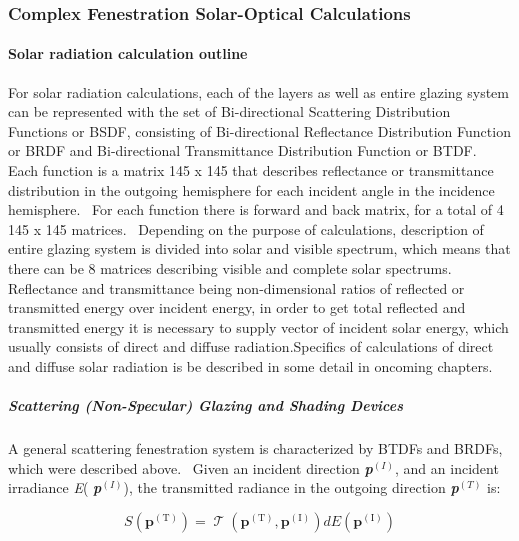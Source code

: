\subsubsection{Complex Fenestration Solar-Optical Calculations}\label{complex-fenestration-solar-optical-calculations}

\paragraph{\textbf{Solar radiation calculation outline}}\label{solar-radiation-calculation-outline}

For solar radiation calculations, each of the layers as well as entire glazing system can be represented with the set of Bi-directional Scattering Distribution Functions or BSDF, consisting of Bi-directional Reflectance Distribution Function or BRDF and Bi-directional Transmittance Distribution Function or BTDF.~ Each function is a matrix 145 x 145 that describes reflectance or transmittance distribution in the outgoing hemisphere for each incident angle in the incidence hemisphere.~ For each function there is forward and back matrix, for a total of 4 145 x 145 matrices.~ Depending on the purpose of calculations, description of entire glazing system is divided into solar and visible spectrum, which means that there can be 8 matrices describing visible and complete solar spectrums.~ Reflectance and transmittance being non-dimensional ratios of reflected or transmitted energy over incident energy, in order to get total reflected and transmitted energy it is necessary to supply vector of incident solar energy, which usually consists of direct and diffuse radiation.Specifics of calculations of direct and diffuse solar radiation is be described in some detail in oncoming chapters.

\subparagraph{\textbf{Scattering (Non-Specular) Glazing and Shading Devices}}\label{scattering-non-specular-glazing-and-shading-devices}

A general scattering fenestration system is characterized by BTDFs and BRDFs, which were described above.~ Given an incident direction \textbf{\emph{p}}\(^{(I)}\), and an incident irradiance \emph{E}( \textbf{\emph{p}}\(^{(I)}\)), the transmitted radiance in the outgoing direction \textbf{\emph{p}}\(^{(T)}\) is:

\begin{equation}
S({{\mathbf{p}}^{{\mathrm{(T)}}}}) = \operatorname{\mathcal{T}} ({{\mathbf{p}}^{{\mathrm{(T)}}}},{{\mathbf{p}}^{{\mathrm{(I)}}}})dE({{\mathbf{p}}^{{\mathrm{(I)}}}})
\label{eq:SofptotheTDiffEq}
\end{equation}

